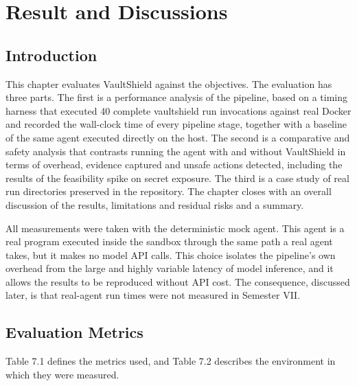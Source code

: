 \documentclass[12pt,a4paper,oneside]{report}
\begin{document}
\clearpage

\chapter{Result and Discussions}\label{results-and-analysis}

\section{Introduction}\label{introduction-1}

This chapter evaluates VaultShield against the objectives. The evaluation has three parts. The first is a performance analysis of the pipeline, based on a timing harness that executed 40 complete vaultshield run invocations against real Docker and recorded the wall-clock time of every pipeline stage, together with a baseline of the same agent executed directly on the host. The second is a comparative and safety analysis that contrasts running the agent with and without VaultShield in terms of overhead, evidence captured and unsafe actions detected, including the results of the feasibility spike on secret exposure. The third is a case study of real run directories preserved in the repository. The chapter closes with an overall discussion of the results, limitations and residual risks and a summary.

All measurements were taken with the deterministic mock agent. This agent is a real program executed inside the sandbox through the same path a real agent takes, but it makes no model API calls. This choice isolates the pipeline's own overhead from the large and highly variable latency of model inference, and it allows the results to be reproduced without API cost. The consequence, discussed later, is that real-agent run times were not measured in Semester VII.

\section{Evaluation Metrics}\label{evaluation-metrics}

Table 7.1 defines the metrics used, and Table 7.2 describes the environment in which they were measured.
\end{document}
